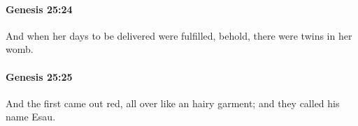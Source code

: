 		\paragraph{Genesis 25:24} %
			\label{GENESIS-25-24}

			And when her days to be delivered were fulfilled, behold, there were twins in her womb.


		\paragraph{Genesis 25:25} %
			\label{GENESIS-25-25}

			And the first came out red, all over like an hairy garment; and they called his name Esau.


